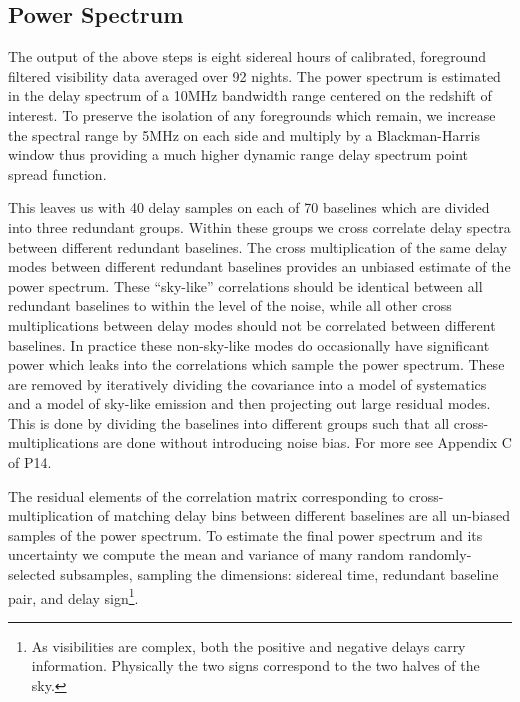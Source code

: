 \documentclass{aastex}
\begin{document}
\subsection{Power Spectrum}
\label{sec:power_spectrum}
The output of the above steps is eight sidereal hours of calibrated, foreground filtered visibility data averaged over 92 nights. The power spectrum is estimated in the delay spectrum of  a 10MHz bandwidth range centered on the redshift of interest. To preserve the isolation of any foregrounds which remain, we increase the spectral range by 5MHz on each side and multiply by a Blackman-Harris window thus providing a much higher dynamic range delay spectrum point spread function. 

This leaves us with 40 delay samples on each of 70 baselines which are divided into three redundant groups. Within these groups we cross correlate delay spectra between different redundant baselines.  The cross multiplication of the same delay modes between different redundant baselines provides an unbiased estimate of the power spectrum.  These ``sky-like'' correlations should be identical between all redundant baselines to within the level of the noise, while all other cross multiplications between delay modes should not be correlated between different baselines. In practice  these non-sky-like modes do occasionally have significant power which leaks into the correlations which sample the power spectrum.  These are removed by iteratively dividing the covariance into a model of systematics and a model of sky-like emission and then projecting out large residual modes. This is done by dividing the baselines into different groups such that all cross-multiplications are done without introducing noise bias.  For more see Appendix C of P14.

The residual elements of the correlation matrix corresponding to cross-multiplication of matching delay bins between different baselines are all un-biased samples of the power spectrum. To estimate the final power spectrum and its uncertainty we compute the mean and variance of many random randomly-selected subsamples, sampling the dimensions: sidereal time, redundant baseline pair, and delay sign\footnote{As visibilities are complex, both the positive and negative delays  carry  information. Physically the two signs correspond to the two halves of the sky.}.
\end{document}
